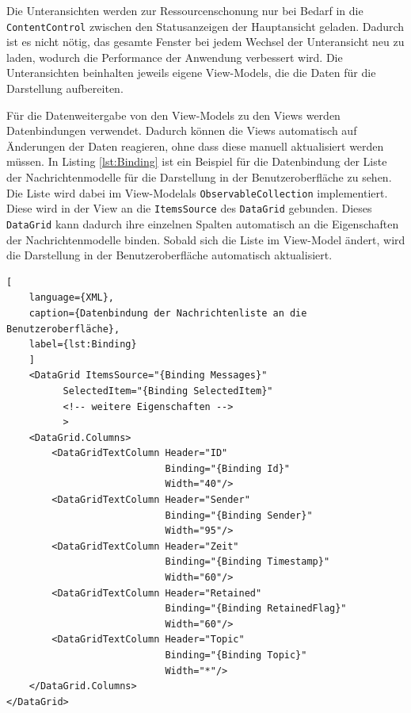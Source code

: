 Die Unteransichten werden zur Ressourcenschonung nur bei Bedarf in die \lstinline{ContentControl} zwischen den Statusanzeigen der Hauptansicht geladen. Dadurch ist es nicht nötig, das gesamte Fenster bei jedem Wechsel der Unteransicht neu zu laden, wodurch die Performance der Anwendung verbessert wird. Die Unteransichten beinhalten jeweils eigene View-Models, die die Daten für die Darstellung aufbereiten. 

Für die Datenweitergabe von den View-Models zu den Views werden Datenbindungen verwendet. Dadurch können die Views automatisch auf Änderungen der Daten reagieren, ohne dass diese manuell aktualisiert werden müssen. In Listing \ref{lst:Binding} ist ein Beispiel für die Datenbindung der Liste der Nachrichtenmodelle für die Darstellung in der Benutzeroberfläche zu sehen. Die Liste wird dabei im View-Modelals \lstinline{ObservableCollection} implementiert. Diese wird in der View an die \lstinline{ItemsSource} des \lstinline{DataGrid} gebunden. Dieses \lstinline{DataGrid} kann dadurch ihre einzelnen Spalten automatisch an die Eigenschaften der Nachrichtenmodelle binden. Sobald sich die Liste im View-Model ändert, wird die Darstellung in der Benutzeroberfläche automatisch aktualisiert.

\begin{lstlisting}[
    language={XML},
    caption={Datenbindung der Nachrichtenliste an die Benutzeroberfläche},
    label={lst:Binding}
    ]
    <DataGrid ItemsSource="{Binding Messages}"
          SelectedItem="{Binding SelectedItem}"
          <!-- weitere Eigenschaften -->
          >
    <DataGrid.Columns>
        <DataGridTextColumn Header="ID"
                            Binding="{Binding Id}"
                            Width="40"/>
        <DataGridTextColumn Header="Sender"
                            Binding="{Binding Sender}"
                            Width="95"/>
        <DataGridTextColumn Header="Zeit"
                            Binding="{Binding Timestamp}"
                            Width="60"/>
        <DataGridTextColumn Header="Retained"
                            Binding="{Binding RetainedFlag}"
                            Width="60"/>
        <DataGridTextColumn Header="Topic"
                            Binding="{Binding Topic}"
                            Width="*"/>
    </DataGrid.Columns>
</DataGrid>
\end{lstlisting}